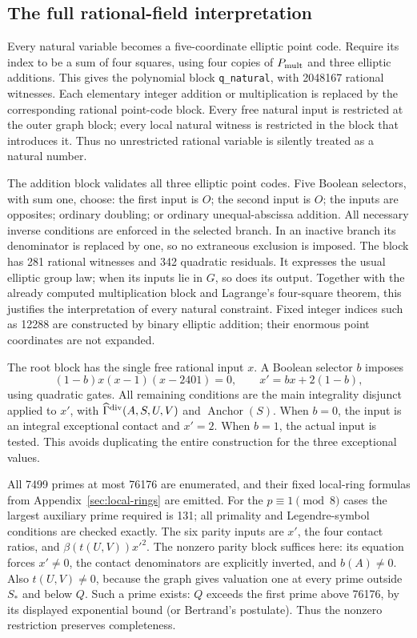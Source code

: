 \documentclass[11pt]{article}
\theoremstyle{definition}
\begin{document}
\subsection{The full rational-field interpretation}

Every natural variable becomes a five-coordinate elliptic point code.
Require its index to be a sum of four squares, using four copies of
\(P_{\rm mult}\) and three elliptic additions. This gives the
polynomial block \texttt{q\_natural}, with 2048167 rational witnesses.
Each elementary integer addition or multiplication is replaced by the
corresponding rational point-code block. Every free natural input is
restricted at the outer graph block; every local natural witness is
restricted in the block that introduces it. Thus no unrestricted rational
variable is silently treated as a natural number.

The addition block validates all three elliptic point codes. Five
Boolean selectors, with sum one, choose: the first input is \(O\);
the second input is \(O\); the inputs are opposites; ordinary doubling;
or ordinary unequal-abscissa addition. All necessary inverse conditions
are enforced in the selected branch. In an inactive branch its denominator
is replaced by one, so no extraneous exclusion is imposed. The block has
281 rational witnesses and 342 quadratic residuals. It expresses the
usual elliptic group law; when its inputs lie in \(G\), so does its output.
Together with the already computed multiplication block and Lagrange's
four-square theorem, this justifies the interpretation of every natural
constraint. Fixed integer indices such as 12288 are constructed by binary
elliptic addition; their enormous point coordinates are not expanded.

The root block has the single free rational input \(x\). A Boolean
selector \(b\) imposes
\[
 (1-b)x(x-1)(x-2401)=0,\qquad x'=bx+2(1-b),
\]
using quadratic gates. All remaining conditions are the main integrality
disjunct applied to \(x'\), with
\(\widehat\Gamma^{\rm div}(A,S,U,V)\) and
\(\operatorname{Anchor}(S)\). When \(b=0\), the input is an
integral exceptional contact and \(x'=2\). When \(b=1\), the actual
input is tested. This avoids duplicating the entire construction for the
three exceptional values.

All 7499 primes at most 76176 are enumerated, and their fixed local-ring
formulas from Appendix~\ref{sec:local-rings} are emitted. For the
\(p\equiv1\pmod8\) cases the largest auxiliary prime required is
131; all primality and Legendre-symbol conditions are checked exactly.
The six parity inputs are \(x'\), the four contact ratios, and
\(\beta(t(U,V))x'^2\). The nonzero parity block suffices here:
its equation forces \(x'\ne0\), the contact denominators are
explicitly inverted, and \(b(A)\ne0\). Also \(t(U,V)\ne0\),
because the graph gives valuation one at every prime outside \(S_*\)
and below \(Q\). Such a prime exists: \(Q\) exceeds the first
prime above 76176, by its displayed exponential bound (or Bertrand's
postulate). Thus the nonzero restriction preserves completeness.
\end{document}
